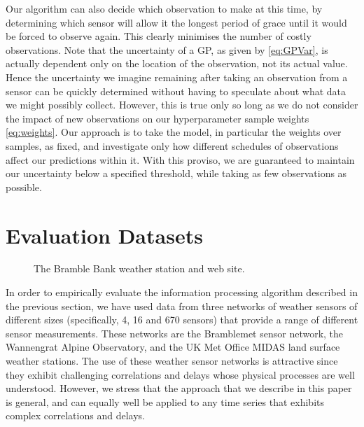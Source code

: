 \documentclass{acmtrans2m}
\begin{document}
Our algorithm can also decide which observation to make at this time, by determining which sensor will allow it the longest period of grace until it would be forced to observe again. This clearly minimises the number of costly observations. Note that the uncertainty of a GP, as given by \eqref{eq:GPVar}, is actually dependent only on the location of the observation, not its actual value. Hence the uncertainty we imagine remaining after taking an observation from a sensor can be quickly determined without having to speculate about what data we might possibly collect. However, this is true only so long as we do not consider the impact of new observations on our hyperparameter sample weights \eqref{eq:weights}. Our approach is to take the model, in particular the weights over samples, as fixed, and investigate only how different schedules of observations affect our predictions within it. With this proviso, we are guaranteed to maintain our uncertainty below a specified threshold, while taking as few observations as possible.

\section{Evaluation Datasets}\label{sec_implementation}

\begin{figure}
\begin{center}
 \hspace{0.25cm}
\caption{The Bramble Bank weather station and web site.}
\label{bramble_sensor}
\end{center}
\end{figure}

\noindent In order to empirically evaluate the information processing algorithm described in the previous section, we have used data from three networks of weather sensors of different sizes (specifically, 4, 16 and 670 sensors) that provide a range of different sensor measurements. These networks are the Bramblemet sensor network, the Wannengrat Alpine Observatory, and the UK Met Office MIDAS land surface weather stations. The use of these weather sensor networks is attractive since they exhibit challenging correlations and delays whose physical processes are well understood. However, we stress that the approach that we describe in this paper is general, and can equally well be applied to any time series that exhibits complex correlations and delays.
\end{document}
